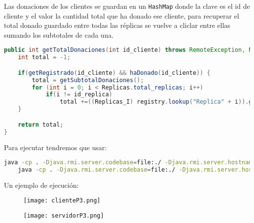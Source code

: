 Las donaciones de los clientes se guardan en un \texttt{HashMap} donde la clave es el id de cliente y el valor la cantidad total
que ha donado ese cliente, para recuperar el total donado guardado entre todas las réplicas se vuelve a cliclar entre ellas
sumando los subtotales de cada una.

\begin{lstlisting}[language=java]
public int getTotalDonaciones(int id_cliente) throws RemoteException, NotBoundException {
	int total = -1;

	if(getRegistrado(id_cliente) && haDonado(id_cliente)) {
		total = getSubtotalDonaciones();
		for (int i = 0; i < Replicas.total_replicas; i++)
			if(i != id_replica)
				total +=((Replicas_I) registry.lookup("Replica" + i)).getSubtotalDonaciones();
	}

	return total;
}
\end{lstlisting}


Para ejecutar tendremos que usar:

\begin{lstlisting}[language=sh]
	java -cp . -Djava.rmi.server.codebase=file:./ -Djava.rmi.server.hostname=localhost -Djava.security.policy=server.policy practica3.Servidor
	java -cp . -Djava.rmi.server.codebase=file:./ -Djava.rmi.server.hostname=localhost -Djava.security.policy=server.policy practica3.Cliente
\end{lstlisting}

Un ejemplo de ejecución:

\begin{figure}[!ht]
	\begin{center}
		\texttt{[image: clienteP3.png]}
	\end{center}
\end{figure}

\begin{figure}[!ht]
	\begin{center}
		\texttt{[image: servidorP3.png]}
	\end{center}
\end{figure}
